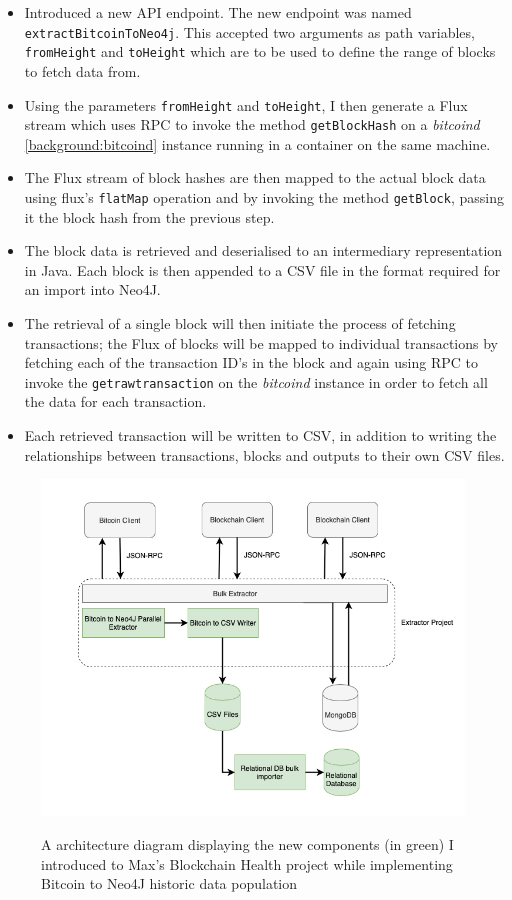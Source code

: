 \begin{itemize}
    \item Introduced a new API endpoint. The new endpoint was named \texttt{extractBitcoinToNeo4j}. This accepted two arguments as path variables, \texttt{fromHeight} and \texttt{toHeight} which are to be used to define the range of blocks to fetch data from. 
    \item Using the parameters \texttt{fromHeight} and \texttt{toHeight}, I then generate a Flux stream which uses RPC to invoke the method \texttt{getBlockHash} on a \textit{bitcoind} \ref{background:bitcoind} instance running in a container on the same machine. 
    \item The Flux stream of block hashes are then mapped to the actual block data using flux's \texttt{flatMap} operation and by invoking the method \texttt{getBlock}, passing it the block hash from the previous step. 
    \item The block data is retrieved and deserialised to an intermediary representation in Java. Each block is then appended to a CSV file in the format required for an import into Neo4J. 
    \item The retrieval of a single block will then initiate the process of fetching transactions; the Flux of blocks will be mapped to individual transactions by fetching each of the transaction ID's in the block and again using RPC to invoke the \texttt{getrawtransaction} on the \textit{bitcoind} instance in order to fetch all the data for each transaction. 
    \item Each retrieved transaction will be written to CSV, in addition to writing the relationships between transactions, blocks and outputs to their own CSV files. 
\end{itemize}

\begin{figure}[h!]
  \centering
  \includegraphics[width = 15cm]{./figures/adding-bitcoin-extractor-diagram}\\[0.5cm] 
  \caption{A architecture diagram displaying the new components (in green) I introduced to Max's Blockchain Health project while implementing Bitcoin to Neo4J historic data population}
  \label{fig:neo4j-layout}
\end{figure}

